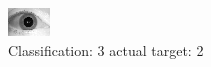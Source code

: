 \begin{figure}[h!]
\begin{center}
\includegraphics[width=0.60\columnwidth]{figures/ID1729_class_3_target_2.png}
\end{center}
\caption{ Classification: 3 actual target: 2}
\label{fig:ID1729_class_3_target_2}
\end{figure}

